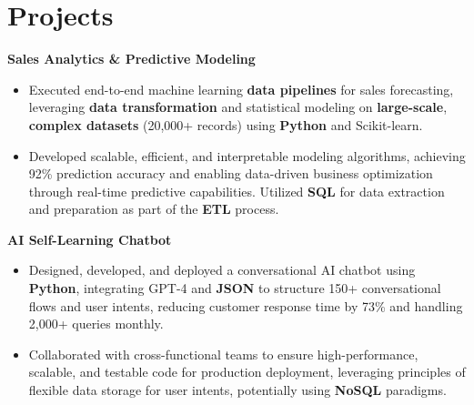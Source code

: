 \documentclass[a4paper,10pt]{article}
\begin{document}
\vspace{-4mm}

\section*{Projects}
\textbf{Sales Analytics \& Predictive Modeling} \\
\begin{itemize}[leftmargin=*, itemsep=0pt, parsep=1pt]
\vspace{-7mm}
    \item Executed end-to-end machine learning \textbf{data pipelines} for sales forecasting, leveraging \textbf{data transformation} and statistical modeling on \textbf{large-scale}, \textbf{complex datasets} (20,000+ records) using \textbf{Python} and Scikit-learn.
    \item Developed scalable, efficient, and interpretable modeling algorithms, achieving 92\% prediction accuracy and enabling data-driven business optimization through real-time predictive capabilities. Utilized \textbf{SQL} for data extraction and preparation as part of the \textbf{ETL} process.
    \end{itemize}

\vspace{-2mm}
\textbf{AI Self-Learning Chatbot} \\
\begin{itemize}[leftmargin=*, itemsep=0pt, parsep=1pt]
\vspace{-7mm}
    \item Designed, developed, and deployed a conversational AI chatbot using \textbf{Python}, integrating GPT-4 and \textbf{JSON} to structure 150+ conversational flows and user intents, reducing customer response time by 73\% and handling 2,000+ queries monthly.
    \item Collaborated with cross-functional teams to ensure high-performance, scalable, and testable code for production deployment, leveraging principles of flexible data storage for user intents, potentially using \textbf{NoSQL} paradigms.
\end{itemize}

\vspace{-2mm}
\end{document}
